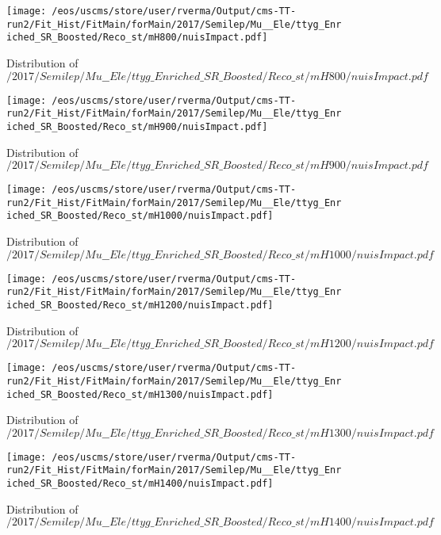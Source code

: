 \begin{figure}
\centering
\texttt{[image: /eos/uscms/store/user/rverma/Output/cms-TT-run2/Fit\_Hist/FitMain/forMain/2017/Semilep/Mu\_\_Ele/ttyg\_Enriched\_SR\_Boosted/Reco\_st/mH800/nuisImpact.pdf]}
\caption{Distribution of $/2017/Semilep/Mu\_\_Ele/ttyg\_Enriched\_SR\_Boosted/Reco\_st/mH800/nuisImpact.pdf$}
\end{figure}

\begin{figure}
\centering
\texttt{[image: /eos/uscms/store/user/rverma/Output/cms-TT-run2/Fit\_Hist/FitMain/forMain/2017/Semilep/Mu\_\_Ele/ttyg\_Enriched\_SR\_Boosted/Reco\_st/mH900/nuisImpact.pdf]}
\caption{Distribution of $/2017/Semilep/Mu\_\_Ele/ttyg\_Enriched\_SR\_Boosted/Reco\_st/mH900/nuisImpact.pdf$}
\end{figure}

\begin{figure}
\centering
\texttt{[image: /eos/uscms/store/user/rverma/Output/cms-TT-run2/Fit\_Hist/FitMain/forMain/2017/Semilep/Mu\_\_Ele/ttyg\_Enriched\_SR\_Boosted/Reco\_st/mH1000/nuisImpact.pdf]}
\caption{Distribution of $/2017/Semilep/Mu\_\_Ele/ttyg\_Enriched\_SR\_Boosted/Reco\_st/mH1000/nuisImpact.pdf$}
\end{figure}

\begin{figure}
\centering
\texttt{[image: /eos/uscms/store/user/rverma/Output/cms-TT-run2/Fit\_Hist/FitMain/forMain/2017/Semilep/Mu\_\_Ele/ttyg\_Enriched\_SR\_Boosted/Reco\_st/mH1200/nuisImpact.pdf]}
\caption{Distribution of $/2017/Semilep/Mu\_\_Ele/ttyg\_Enriched\_SR\_Boosted/Reco\_st/mH1200/nuisImpact.pdf$}
\end{figure}

\begin{figure}
\centering
\texttt{[image: /eos/uscms/store/user/rverma/Output/cms-TT-run2/Fit\_Hist/FitMain/forMain/2017/Semilep/Mu\_\_Ele/ttyg\_Enriched\_SR\_Boosted/Reco\_st/mH1300/nuisImpact.pdf]}
\caption{Distribution of $/2017/Semilep/Mu\_\_Ele/ttyg\_Enriched\_SR\_Boosted/Reco\_st/mH1300/nuisImpact.pdf$}
\end{figure}

\begin{figure}
\centering
\texttt{[image: /eos/uscms/store/user/rverma/Output/cms-TT-run2/Fit\_Hist/FitMain/forMain/2017/Semilep/Mu\_\_Ele/ttyg\_Enriched\_SR\_Boosted/Reco\_st/mH1400/nuisImpact.pdf]}
\caption{Distribution of $/2017/Semilep/Mu\_\_Ele/ttyg\_Enriched\_SR\_Boosted/Reco\_st/mH1400/nuisImpact.pdf$}
\end{figure}

